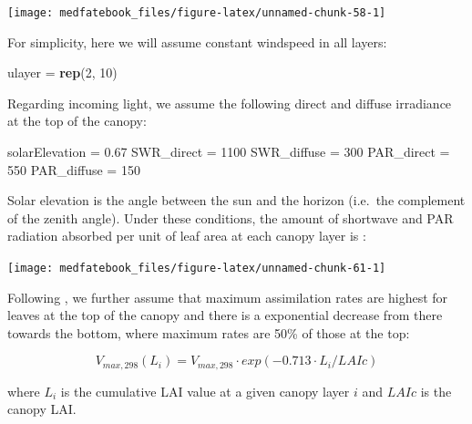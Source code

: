 \documentclass[]{book}
\newenvironment{Shaded}{\begin{snugshade}}{\end{snugshade}}
\newcommand{\KeywordTok}[1]{\textcolor[rgb]{0.13,0.29,0.53}{\textbf{#1}}}
\newcommand{\DecValTok}[1]{\textcolor[rgb]{0.00,0.00,0.81}{#1}}
\newcommand{\FloatTok}[1]{\textcolor[rgb]{0.00,0.00,0.81}{#1}}
\newcommand{\StringTok}[1]{\textcolor[rgb]{0.31,0.60,0.02}{#1}}
\newcommand{\NormalTok}[1]{#1}
\begin{document}
\begin{center}\texttt{[image: medfatebook\_files/figure-latex/unnamed-chunk-58-1]} \end{center}

For simplicity, here we will assume constant windspeed in all layers:

\begin{Shaded}
\begin{Highlighting}[]
\NormalTok{ulayer =}\StringTok{ }\KeywordTok{rep}\NormalTok{(}\DecValTok{2}\NormalTok{, }\DecValTok{10}\NormalTok{)}
\end{Highlighting}
\end{Shaded}

Regarding incoming light, we assume the following direct and diffuse
irradiance at the top of the canopy:

\begin{Shaded}
\begin{Highlighting}[]
\NormalTok{solarElevation =}\StringTok{ }\FloatTok{0.67}
\NormalTok{SWR_direct =}\StringTok{ }\DecValTok{1100}
\NormalTok{SWR_diffuse =}\StringTok{ }\DecValTok{300}
\NormalTok{PAR_direct =}\StringTok{ }\DecValTok{550}
\NormalTok{PAR_diffuse =}\StringTok{ }\DecValTok{150}
\end{Highlighting}
\end{Shaded}

Solar elevation is the angle between the sun and the horizon (i.e.~the
complement of the zenith angle). Under these conditions, the amount of
shortwave and PAR radiation absorbed per unit of leaf area at each
canopy layer is \citep{Anten2016}:

\begin{center}\texttt{[image: medfatebook\_files/figure-latex/unnamed-chunk-61-1]} \end{center}

Following \citet{DePury1997}, we further assume that maximum
assimilation rates are highest for leaves at the top of the canopy and
there is a exponential decrease from there towards the bottom, where
maximum rates are 50\% of those at the top:

\begin{equation}
V_{max,298}(L_i) =V_{max,298}\cdot exp(-0.713\cdot L_i/LAIc)   
\end{equation}

where \(L_i\) is the cumulative LAI value at a given canopy layer \(i\)
and \(LAIc\) is the canopy LAI.
\end{document}
